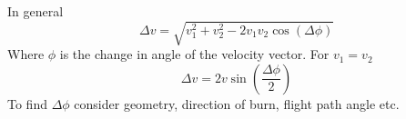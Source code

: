 \documentclass[table,cmyk,fleqn]{article}
\begin{document}
\begin{longtable}
In general
\[\Delta v = \sqrt{v_1^2 + v_2^2 - 2v_1v_2\cos (\Delta \phi)}\]
Where $\phi$ is the change in angle of the velocity vector. For $v_1 = v_2$
\[\Delta v = 2v\sin \left( \frac{\Delta \phi}{2}\right)\]
To find $\Delta \phi$ consider geometry, direction of burn, flight path angle etc.
\tabularnewline\hline


\end{longtable}
\end{document}
